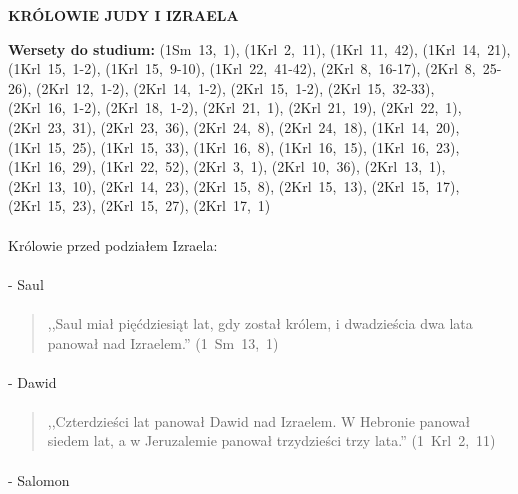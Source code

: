 \documentclass[10pt,a4paper,oneside]{article}
\begin{document}
\centerline{\textbf{\MakeUppercase{Królowie Judy i Izraela}}}
\begin{center}
\textbf{Wersety do studium:} 
\mbox{(1Sm 13, 1)}, \mbox{(1Krl 2, 11)}, \mbox{(1Krl 11, 42)}, \mbox{(1Krl 14, 21)}, \mbox{(1Krl 15, 1-2)}, \mbox{(1Krl 15, 9-10)}, \mbox{(1Krl 22, 41-42)}, \mbox{(2Krl 8, 16-17)}, \mbox{(2Krl 8, 25-26)}, \mbox{(2Krl 12, 1-2)}, \mbox{(2Krl 14, 1-2)}, \mbox{(2Krl 15, 1-2)}, \mbox{(2Krl 15, 32-33)}, \mbox{(2Krl 16, 1-2)}, \mbox{(2Krl 18, 1-2)}, \mbox{(2Krl 21, 1)}, \mbox{(2Krl 21, 19)}, \mbox{(2Krl 22, 1)}, \mbox{(2Krl 23, 31)}, \mbox{(2Krl 23, 36)}, \mbox{(2Krl 24, 8)}, \mbox{(2Krl 24, 18)}, \mbox{(1Krl 14, 20)}, \mbox{(1Krl 15, 25)}, \mbox{(1Krl 15, 33)}, \mbox{(1Krl 16, 8)}, \mbox{(1Krl 16, 15)}, \mbox{(1Krl 16, 23)}, \mbox{(1Krl 16, 29)}, \mbox{(1Krl 22, 52)}, \mbox{(2Krl 3, 1)}, \mbox{(2Krl 10, 36)}, \mbox{(2Krl 13, 1)}, \mbox{(2Krl 13, 10)}, \mbox{(2Krl 14, 23)}, \mbox{(2Krl 15, 8)}, \mbox{(2Krl 15, 13)}, \mbox{(2Krl 15, 17)}, \mbox{(2Krl 15, 23)}, \mbox{(2Krl 15, 27)}, \mbox{(2Krl 17, 1)}
\end{center}
\paragraph{}
Królowie przed podziałem Izraela:
\paragraph{}
- Saul
\paragraph{}
\begin{quote}
,,Saul miał pięćdziesiąt lat, gdy został królem, i dwadzieścia dwa lata panował nad Izraelem.'' \mbox{(1 Sm 13, 1)}
\end{quote}
\paragraph{}
- Dawid
\paragraph{}
\begin{quote}
,,Czterdzieści lat panował Dawid nad Izraelem. W Hebronie panował siedem lat, a w Jeruzalemie panował trzydzieści trzy lata.'' \mbox{(1 Krl 2, 11)}
\end{quote}
\paragraph{}
- Salomon
\end{document}
